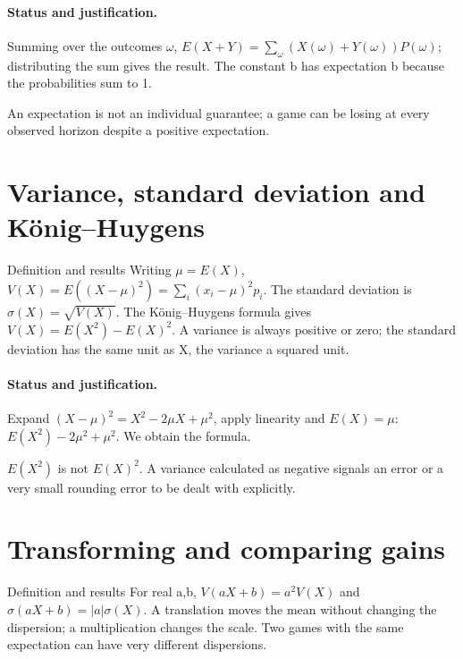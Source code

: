 \paragraph{Status and justification.} Summing over the outcomes $\omega$, $E(X+Y)=\sum_\omega(X(\omega)+Y(\omega))P(\omega)$; distributing the sum gives the result. The constant b has expectation b because the probabilities sum to 1.
\label{C08-EX2}
\begin{erreur}An expectation is not an individual guarantee; a game can be losing at every observed horizon despite a positive expectation.\end{erreur}
\label{C08-AP2}
\section{Variance, standard deviation and König--Huygens}\label{C08-U3}
\begin{repere}{Definition and results}
Writing $\mu=E(X)$, $V(X)=E((X-\mu)^2)=\sum_i(x_i-\mu)^2p_i$. The standard deviation is $\sigma(X)=\sqrt{V(X)}$. The König--Huygens formula gives $V(X)=E(X^2)-E(X)^2$. A variance is always positive or zero; the standard deviation has the same unit as X, the variance a squared unit.
\end{repere}
\paragraph{Status and justification.} Expand $(X-\mu)^2=X^2-2\mu X+\mu^2$, apply linearity and $E(X)=\mu$: $E(X^2)-2\mu^2+\mu^2$. We obtain the formula.
\label{C08-EX3}
\begin{erreur}$E(X^2)$ is not $E(X)^2$. A variance calculated as negative signals an error or a very small rounding error to be dealt with explicitly.\end{erreur}
\label{C08-AP3}
\section{Transforming and comparing gains}\label{C08-U4}
\begin{repere}{Definition and results}
For real a,b, $V(aX+b)=a^2V(X)$ and $\sigma(aX+b)=|a|\sigma(X)$. A translation moves the mean without changing the dispersion; a multiplication changes the scale. Two games with the same expectation can have very different dispersions.
\end{repere}
